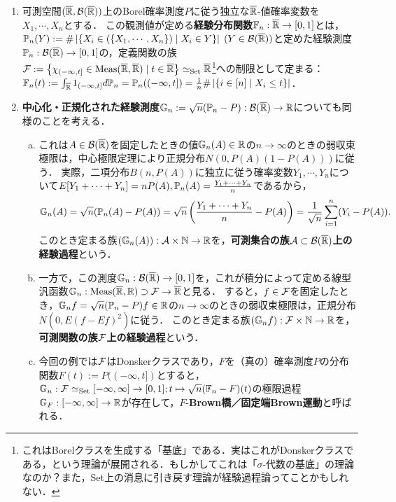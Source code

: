 \documentclass[uplatex,dvipdfmx]{jsreport}
\begin{document}
\begin{example}\mbox{}
    \begin{enumerate}
        \item 可測空間$(\overline{\mathbb{R}},\mathcal{B}(\overline{\mathbb{R}}))$上のBorel確率測度$P$に従う独立な$\overline{\mathbb{R}}$-値確率変数を$X_1,\cdots,X_n$とする．
        この観測値が定める\textbf{経験分布関数}$\mathbb{F}_n:\overline{\mathbb{R}}\to[0,1]$とは，$\mathbb{P}_n(Y):=\#\left|\left\{X_i\in(\{X_1,\cdots,X_n\})\mid X_i\in Y\right\}\right|\;(Y\in\mathcal{B}(\overline{\mathbb{R}}))$と定めた経験測度
        $\mathbb{P}_n:\mathcal{B}(\overline{\mathbb{R}})\to[0,1]$の，定義関数の族$\mathcal{F}:=\left\{\chi_{(-\infty,t]}\in\mathrm{Meas}(\overline{\mathbb{R}},\overline{\mathbb{R}})\mid t\in\overline{\mathbb{R}}\right\}\simeq_{\mathrm{Set}}\overline{\mathbb{R}}$\footnote{これはBorelクラスを生成する「基底」である．実はこれがDonskerクラスである，という理論が展開される．もしかしてこれは「$\sigma$-代数の基底」の理論なのか？また，Set上の消息に引き戻す理論が経験過程論ってことかもしれない．}への制限として定まる：$\mathbb{F}_n(t):=\int_{\overline{\mathbb{R}}}1_{(-\infty,t]}d\mathbb{P}_n=\mathbb{P}_n((-\infty,t])=\frac{1}{n}\#\left|\left\{i\in[n]\mid X_i\le t\right\}\right|$．
        \item \textbf{中心化・正規化された経験測度}$\mathbb{G}_n:=\sqrt{n}(\mathbb{P}_n-P):\mathcal{B}(\overline{\mathbb{R}})\to\mathbb{R}$についても同様のことを考える．
        \begin{enumerate}[(a)]
            \item これは$A\in\mathcal{B}(\overline{\mathbb{R}})$を固定したときの値$\mathbb{G}_n(A)\in\mathbb{R}$の$n\to\infty$のときの弱収束極限は，中心極限定理により正規分布$N(0,P(A)(1-P(A)))$に従う．
            実際，二項分布$B(n,P(A))$に独立に従う確率変数$Y_1,\cdots,Y_n$について$E[Y_1+\cdots+Y_n]=nP(A),\mathbb{P}_n(A)=\frac{Y_1+\cdots+Y_n}{n}$であるから，
            \[\mathbb{G}_n(A)=\sqrt{n}(\mathbb{P}_n(A)-P(A))=\sqrt{n}\left(\frac{Y_1+\cdots+Y_n}{n}-P(A)\right)=\frac{1}{\sqrt{n}}\sum_{i=1}^n(Y_i-P(A)).\]
            このとき定まる族$(\mathbb{G}_n(A)):\mathcal{A}\times\mathbb{N}\to\mathbb{R}$を，\textbf{可測集合の族$\mathcal{A}\subset\mathcal{B}(\overline{\mathbb{R}})$上の経験過程}という．
            \item 一方で，この測度$\mathbb{G}_n:\mathcal{B}(\overline{\mathbb{R}})\to[0,1]$を，これが積分によって定める線型汎函数$\mathbb{G}_n:\mathrm{Meas}(\overline{\mathbb{R}},\mathbb{R})\supset\mathcal{F}\to\overline{\mathbb{R}}$と見る．
            すると，$f\in\mathcal{F}$を固定したとき，$\mathbb{G}_nf=\sqrt{n}(\mathbb{P}_n-P)f\in\mathbb{R}$の$n\to\infty$のときの弱収束極限は，正規分布$N(0,E(f-Ef)^2)$に従う．
            このとき定まる族$(\mathbb{G}_nf):\mathcal{F}\times\mathbb{N}\to\mathbb{R}$を，\textbf{可測関数の族$\mathcal{F}$上の経験過程}という．
            \item 今回の例では$\mathcal{F}$はDonskerクラスであり，$F$を（真の）確率測度$P$の分布関数$F(t):=P((-\infty,t])$とすると，
            $\mathbb{G}_n:\mathcal{F}\simeq_{\mathrm{Set}}[-\infty,\infty]\to[0,1];t\mapsto\sqrt{n}(\mathbb{F}_n-F)(t)$の極限過程$\mathbb{G}_F:[-\infty,\infty]\to\mathbb{R}$が存在して，$F$-\textbf{Brown橋／固定端Brown運動}と呼ばれる．

\end{enumerate}
\end{enumerate}
\end{example}
\end{document}
